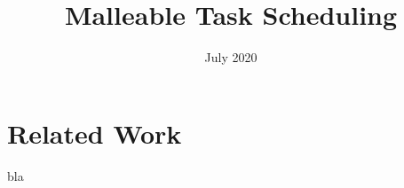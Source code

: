 \documentclass{article}
\author{}
\date{July 2020}
\title{Malleable Task Scheduling}
\begin{document}
    \maketitle
    \section{Related Work}

    bla \cite{Shimada2019Nov}
	

	
	
	
\end{document}
